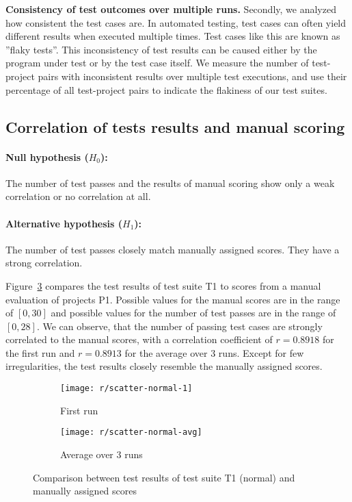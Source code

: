 \textbf{Consistency of test outcomes over multiple runs.}
Secondly, we analyzed how consistent the test cases are.
In automated testing, test cases can often yield different results when executed multiple times.
Test cases like this are known as ''flaky tests''.
This inconsistency of test results can be caused either by the program under test or by the test case itself.
We measure the number of test-project pairs with inconsistent results over multiple test executions,
and use their percentage of all test-project pairs to indicate the flakiness of our test suites.

\subsection{Correlation of tests results and manual scoring}

\paragraph{Null hypothesis ($H_0$):}
The number of test passes and the results of manual scoring show only a weak correlation or no correlation at all.
\vspace{-\medskipamount}
\paragraph{Alternative hypothesis ($H_1$):}
The number of test passes closely match manually assigned scores.
They have a strong correlation.
\parspace

\noindent Figure~\ref{fig:scatter_normal} compares the test results of test suite T1 to scores from a manual evaluation of projects P1.
Possible values for the manual scores are in the range of $[0, 30]$ and possible values for the number of test passes are in the range of $[0, 28]$.
We can observe, that the number of passing test cases are strongly correlated to the manual scores,
with a correlation coefficient of $r = 0.8918$ for the first run and $r = 0.8913$ for the average over 3 runs.
Except for few irregularities, the test results closely resemble the manually assigned scores.

\begin{figure}[htpb]
    \centering
    \begin{subfigure}{.50\textwidth}
        \texttt{[image: r/scatter-normal-1]}
        \caption{First run}
        \label{fig:scatter_normal_1}
    \end{subfigure}%
    \begin{subfigure}{.50\textwidth}
        \texttt{[image: r/scatter-normal-avg]}
        \caption{Average over 3 runs}
        \label{fig:scatter_normal_avg}
    \end{subfigure}
    \caption{Comparison between test results of test suite T1 (normal) and manually assigned scores}
    \label{fig:scatter_normal}
\end{figure}


